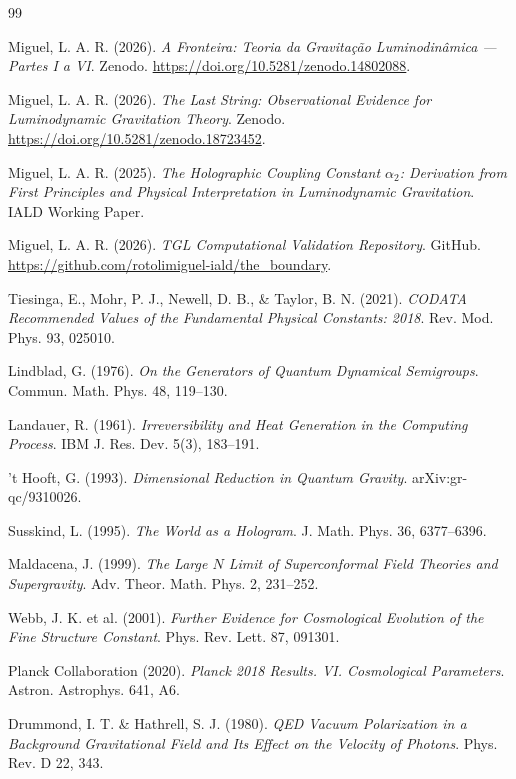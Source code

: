 \documentclass[12pt,a4paper,twoside]{article}
\begin{document}
\begin{thebibliography}{99}

Miguel, L. A. R. (2026).
\textit{A Fronteira: Teoria da Gravita\c{c}\~ao Luminodin\^amica --- Partes I a VI}.
Zenodo. \url{https://doi.org/10.5281/zenodo.14802088}.

Miguel, L. A. R. (2026).
\textit{The Last String: Observational Evidence for Luminodynamic Gravitation Theory}.
Zenodo. \url{https://doi.org/10.5281/zenodo.18723452}.

Miguel, L. A. R. (2025).
\textit{The Holographic Coupling Constant $\alpha_2$: Derivation from First Principles and Physical Interpretation in Luminodynamic Gravitation}.
IALD Working Paper.

Miguel, L. A. R. (2026).
\textit{TGL Computational Validation Repository}.
GitHub. \url{https://github.com/rotolimiguel-iald/the_boundary}.

Tiesinga, E., Mohr, P. J., Newell, D. B., \& Taylor, B. N. (2021).
\textit{CODATA Recommended Values of the Fundamental Physical Constants: 2018}.
Rev. Mod. Phys. 93, 025010.

Lindblad, G. (1976).
\textit{On the Generators of Quantum Dynamical Semigroups}.
Commun. Math. Phys. 48, 119--130.

Landauer, R. (1961).
\textit{Irreversibility and Heat Generation in the Computing Process}.
IBM J. Res. Dev. 5(3), 183--191.

't Hooft, G. (1993).
\textit{Dimensional Reduction in Quantum Gravity}.
arXiv:gr-qc/9310026.

Susskind, L. (1995).
\textit{The World as a Hologram}.
J. Math. Phys. 36, 6377--6396.

Maldacena, J. (1999).
\textit{The Large $N$ Limit of Superconformal Field Theories and Supergravity}.
Adv. Theor. Math. Phys. 2, 231--252.

Webb, J. K. et al. (2001).
\textit{Further Evidence for Cosmological Evolution of the Fine Structure Constant}.
Phys. Rev. Lett. 87, 091301.

Planck Collaboration (2020).
\textit{Planck 2018 Results. VI. Cosmological Parameters}.
Astron. Astrophys. 641, A6.

Drummond, I. T. \& Hathrell, S. J. (1980).
\textit{QED Vacuum Polarization in a Background Gravitational Field and Its Effect on the Velocity of Photons}.
Phys. Rev. D 22, 343.


\end{thebibliography}
\end{document}
